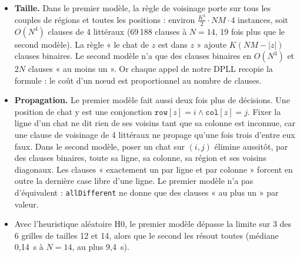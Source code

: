\documentclass[11pt,a4paper]{article}
\newcommand{\code}[1]{\texttt{#1}}
\begin{document}
\begin{itemize}
  \item \textbf{Taille.} Dans le premier modèle, la règle de voisinage porte sur tous les
        couples de régions et toutes les positions : environ $\frac{K^2}{2}\cdot N M \cdot 4$
        instances, soit $O(N^4)$ clauses de 4 littéraux (69\,188 clauses à $N = 14$, 19 fois
        plus que le second modèle). La règle « le chat de $z$ est dans $z$ » ajoute
        $K(NM - |z|)$ clauses binaires. Le second modèle n'a que des clauses binaires en
        $O(N^3)$ et $2N$ clauses « au moins un ». Or chaque appel de notre DPLL recopie la
        formule : le coût d'un nœud est proportionnel au nombre de clauses.
  \item \textbf{Propagation.} Le premier modèle fait aussi deux fois plus de décisions. Une
        position de chat y est une conjonction $\code{row}[z] = i \wedge \code{col}[z] = j$.
        Fixer la ligne d'un chat ne dit rien de ses voisins tant que sa colonne est inconnue,
        car une clause de voisinage de 4 littéraux ne propage qu'une fois trois d'entre eux
        faux. Dans le second modèle, poser un chat sur $(i,j)$ élimine aussitôt, par des
        clauses binaires, toute sa ligne, sa colonne, sa région et ses voisins diagonaux. Les
        clauses « exactement un par ligne et par colonne » forcent en outre la dernière case
        libre d'une ligne. Le premier modèle n'a pas d'équivalent : \code{allDifferent} ne
        donne que des clauses « au plus un » par valeur.
  \item Avec l'heuristique aléatoire H0, le premier modèle dépasse la limite sur 3 des 6
        grilles de tailles 12 et 14, alors que le second les résout toutes (médiane 0,14~s à
        $N = 14$, au plus 9,4~s).
\end{itemize}
\end{document}
